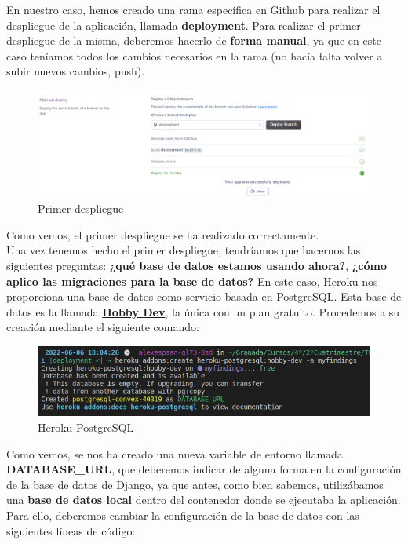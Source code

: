 En nuestro caso, hemos creado una rama específica en Github para realizar el despliegue de
la aplicación, llamada \textbf{deployment}. Para realizar el primer despliegue de la misma,
deberemos hacerlo de \textbf{forma manual}, ya que en este caso teníamos todos los cambios
necesarios en la rama (no hacía falta volver a subir nuevos cambios, push).\\

    \begin{figure}[H]
        \centering
        \includegraphics[scale=0.30]{imagenes/first-deploy.png}
        \caption{Primer despliegue}
        \label{fig:first-deploy}
    \end{figure}

Como vemos, el primer despliegue se ha realizado correctamente.\\


Una vez tenemos hecho el primer despliegue, tendríamos que hacernos las siguientes
preguntas: \textbf{¿qué base de datos estamos usando ahora?}, \textbf{¿cómo aplico las
migraciones para la base de datos?} En este caso, Heroku nos proporciona una base de
datos como servicio basada en PostgreSQL. Esta base de datos es la llamada
\href{https://elements.heroku.com/addons/heroku-postgresql}{\textbf{Hobby Dev}}, la única
con un plan gratuito. Procedemos a su creación mediante el siguiente comando:

    \begin{figure}[H]
        \centering
        \includegraphics[scale=0.50]{imagenes/heroku-postgresql.png}
        \caption{Heroku PostgreSQL}
        \label{fig:heroku-postgresql}
    \end{figure}

Como vemos, se nos ha creado una nueva variable de entorno llamada \textbf{DATABASE\_URL},
que deberemos indicar de alguna forma en la configuración de la base de datos de Django,
ya que antes, como bien sabemos, utilizábamos una \textbf{base de datos local} dentro del
contenedor donde se ejecutaba la aplicación. Para ello, deberemos cambiar la configuración
de la base de datos con las siguientes líneas de código:


